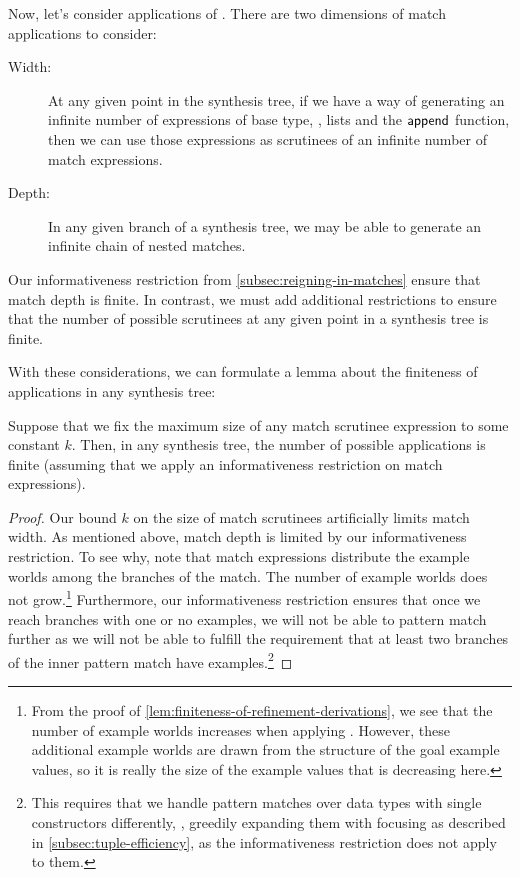 Now, let's consider applications of .
There are two dimensions of match applications to consider:
\begin{description}
  \item[Width:] At any given point in the synthesis tree, if we have a way of generating an infinite number of expressions of base type, \eg, lists and the $\mathsf{append}$ function, then we can use those expressions as scrutinees of an infinite number of match expressions.
  \item[Depth:] In any given branch of a synthesis tree, we may be able to generate an infinite chain of nested matches.
\end{description}
Our informativeness restriction from \autoref{subsec:reigning-in-matches} ensure that match depth is finite.
In contrast, we must add additional restrictions to ensure that the number of possible scrutinees at any given point in a synthesis tree is finite.

With these considerations, we can formulate a lemma about the finiteness of  applications in any synthesis tree:

\begin{proofenv}
  \begin{lemma}
    Suppose that we fix the maximum size of any match scrutinee expression to some constant $k$.  Then, in any synthesis tree, the number of possible  applications is finite (assuming that we apply an informativeness restriction on match expressions).
    \label{lem:finiteness-of-match-derivations}
  \end{lemma}
  \begin{proof}
    Our bound $k$ on the size of match scrutinees artificially limits match width.
    As mentioned above, match depth is limited by our informativeness restriction.
    To see why, note that match expressions distribute the example worlds among the branches of the match.
    The number of example worlds does not grow.\footnote{%
      From the proof of \ref{lem:finiteness-of-refinement-derivations}, we see that the number of example worlds increases when applying .
      However, these additional example worlds are drawn from the structure of the goal example values, so it is really the size of the example values that is decreasing here.
    }
    Furthermore, our informativeness restriction ensures that once we reach branches with one or no examples, we will not be able to pattern match further as we will not be able to fulfill the requirement that at least two branches of the inner pattern match have examples.\footnote{%
      This requires that we handle pattern matches over data types with single constructors differently, \eg, greedily expanding them with focusing as described in \autoref{subsec:tuple-efficiency}, as the informativeness restriction does not apply to them.
    }
  \end{proof}
\end{proofenv}

